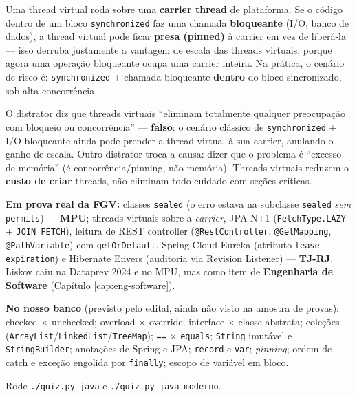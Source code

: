 \begin{conceito}
Uma thread virtual roda sobre uma \textbf{carrier thread} de plataforma. Se o
código dentro de um bloco \texttt{synchronized} faz uma chamada
\textbf{bloqueante} (I/O, banco de dados), a thread virtual pode ficar
\textbf{presa (pinned)} à carrier em vez de liberá-la --- isso derruba
justamente a vantagem de escala das threads virtuais, porque agora uma
operação bloqueante ocupa uma carrier inteira. Na prática, o cenário de risco
é: \texttt{synchronized} + chamada bloqueante \textbf{dentro} do bloco
sincronizado, sob alta concorrência.
\end{conceito}

\begin{pegadinha}
O distrator diz que threads virtuais ``eliminam totalmente qualquer
preocupação com bloqueio ou concorrência'' --- \textbf{falso}: o cenário
clássico de \texttt{synchronized} + I/O bloqueante ainda pode prender a
thread virtual à sua carrier, anulando o ganho de escala. Outro distrator
troca a causa: dizer que o problema é ``excesso de memória'' (é
concorrência/pinning, não memória). Threads virtuais reduzem o \textbf{custo
de criar} threads, não eliminam todo cuidado com seções críticas.
\end{pegadinha}

\begin{jacaiu}
\textbf{Em prova real da FGV:} classes \texttt{sealed} (o erro estava na
subclasse \texttt{sealed} \emph{sem} \texttt{permits}) --- \textbf{MPU};
threads virtuais sobre a \textit{carrier}, JPA N+1 (\texttt{FetchType.LAZY} +
\texttt{JOIN FETCH}), leitura de REST controller (\texttt{@RestController},
\texttt{@GetMapping}, \texttt{@PathVariable}) com \texttt{getOrDefault},
Spring Cloud Eureka (atributo \texttt{lease-expiration}) e Hibernate Envers
(auditoria via Revision Listener) --- \textbf{TJ-RJ}. Liskov caiu na Dataprev
2024 e no MPU, mas como item de \textbf{Engenharia de Software} (Capítulo
\ref{cap:eng-software}).

\textbf{No nosso banco} (previsto pelo edital, ainda não visto na amostra de
provas): checked $\times$ unchecked; overload $\times$ override; interface
$\times$ classe abstrata; coleções
(\texttt{ArrayList}/\texttt{LinkedList}/\texttt{TreeMap}); \texttt{==}
$\times$ \texttt{equals}; \texttt{String} imutável e \texttt{StringBuilder};
anotações de Spring e JPA; \texttt{record} e \texttt{var}; \textit{pinning};
ordem de catch e exceção engolida por \texttt{finally}; escopo de variável em
bloco.

Rode \texttt{./quiz.py java} e \texttt{./quiz.py java-moderno}.
\end{jacaiu}

